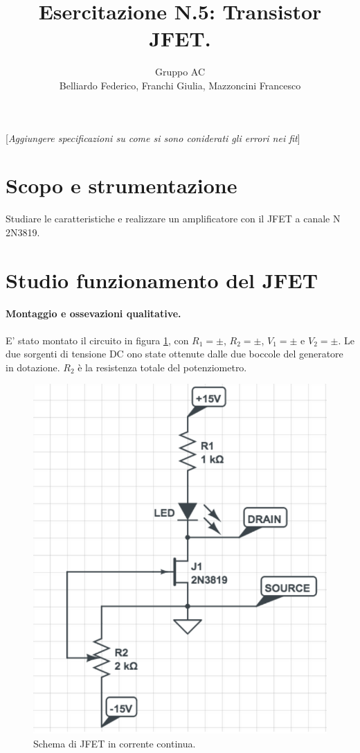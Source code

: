 \documentclass[10pt,a4paper]{article}
\author{Gruppo AC \\ Belliardo Federico, Franchi Giulia, Mazzoncini Francesco}
\title{Esercitazione N.5: Transistor JFET.}
\newcommand{\rem}[1]{[\emph{#1}]}
\begin{document}
\maketitle

\rem{Aggiungere specificazioni su come si sono coniderati gli errori nei fit}
\section{Scopo e strumentazione}
Studiare le caratteristiche e realizzare un amplificatore con il JFET a canale N 2N3819.


\section{Studio funzionamento del JFET}
\paragraph{Montaggio e ossevazioni qualitative.}
E' stato montato il circuito in figura \ref{circuito1}, con  $R_1 = \pm$, $R_2 = \pm$, $V_1 = \pm $ e $V_2 = \pm$. Le due sorgenti di tensione DC ono state ottenute dalle due boccole del generatore in dotazione. $R_2$ è la resistenza totale del potenziometro.

\begin{figure}
\centering
\includegraphics[scale=0.4]{circuito1.png}
\caption{Schema di JFET in corrente continua.\label{circuito1}}
\end{figure}
\end{document}
